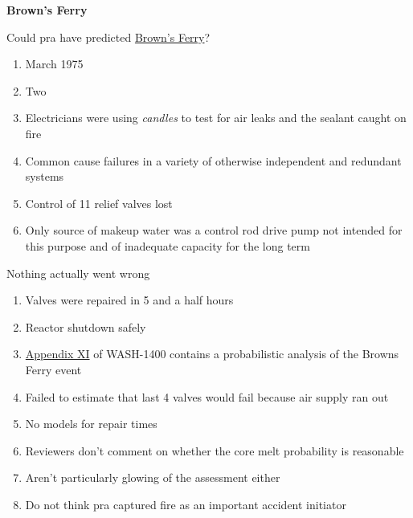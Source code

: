 \documentclass[aspectratio=1610,pdftex,dvipsnames,compress,xcolor={dvipsnames}]{beamer}
\newcommand{\acs}{\acrshort} %
\newcommand{\acsp}{\acrshortpl} %
\begin{document}
\begin{frame}[plain]{}
    \centering\LARGE\textbf{Brown's Ferry}
\end{frame}


\addtocounter{framenumber}{-1}
\begin{frame}{Could \acs{pra} have predicted \href{http://www.ccnr.org/browns_ferry.html}{Brown's Ferry}?}
    \begin{enumerate}[series=outerlist,topsep=0pt,itemsep=21pt,leftmargin=*,label=(\arabic*)]
        \item[]March 1975  
        \item[]Two \acsp{bwr}
        \item[]Electricians were using \textit{candles} to test for air leaks and the sealant caught on fire
        \item[]Common cause failures in a variety of otherwise independent and redundant systems
        \item[]Control of 11 relief valves lost  
        \item[]Only source of makeup water was a control rod drive pump not intended for this purpose and of inadequate capacity for the long term
    \end{enumerate}
\end{frame}


\begin{frame}{Nothing actually went wrong}
    \begin{enumerate}[series=outerlist,topsep=0pt,itemsep=15pt,leftmargin=*,label=(\arabic*)]
        \item[]Valves were repaired in 5 and a half hours 
        \item[]Reactor shutdown safely
        \item[]\href{https://www.osti.gov/biblio/7327154}{Appendix XI} of WASH-1400 contains a probabilistic analysis of the Browns Ferry event
        \item[]Failed to estimate that last 4 valves would fail because air supply ran out  
        \item[]No models for repair times
        \item[]Reviewers don't comment on whether the core melt probability is reasonable
        \item[]Aren't particularly glowing of the assessment either  
        \item[]Do not think \acs{pra} captured fire as an important accident initiator
    \end{enumerate}
\end{frame}
\end{document}
